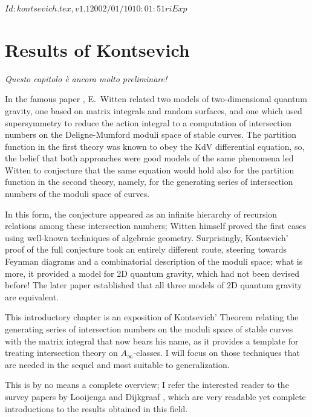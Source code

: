 \RCSID $Id: kontsevich.tex,v 1.1 2002/01/10 10:01:51 ri Exp $


\chapter{Results of Kontsevich}
\label{cha:kontsevich}

{\Large\itshape Questo capitolo {\`e} ancora \emph{molto} preliminare!}

In the famous paper \cite{witten;intersection-theory}, E.~Witten
related two models of two-dimensional quantum gravity, one based on
matrix integrals and random surfaces, and one which used supersymmetry
to reduce the action integral to a computation of intersection numbers
on the Deligne-Mumford moduli space of stable curves. The partition
function in the first theory was known to obey the KdV differential
equation, so, the belief that both approaches were good models of the
same phenomena led Witten to conjecture that the same equation would
hold also for the partition function in the second theory, namely, for
the generating series of intersection numbers of the moduli space of
curves.

In this form, the conjecture appeared as an infinite hierarchy of
recursion relations among these intersection numbers; Witten himself
proved the first cases using well-known techniques of algebraic
geometry.  Surprisingly, Kontsevich' proof of the full conjecture took
an entirely different route, steering towards Feynman diagrams and a
combinatorial description of the moduli space; what is more, it
provided a model for 2D quantum gravity, which had not been devised
before!  The later paper \cite{witten;kontsevich-model} established
that all three models of 2D quantum gravity are equivalent.

This introductory chapter is an exposition of Kontsevich' Theorem
relating the generating series of intersection numbers on the moduli
space of stable curves with the matrix integral that now bears his
name, as it provides a template for treating intersection theory on
$A_\infty$-classes. I will focus on those techniques that are needed in
the sequel and most suitable to generalization.

This is by no means a complete overview; I refer the interested reader
to the survey papers by Looijenga \cite{looijenga;intersection-theory}
and Dijkgraaf \cite{dijkgraaf;intersection-theory}, which are very
readable yet complete introductions to the results obtained in this
field.


